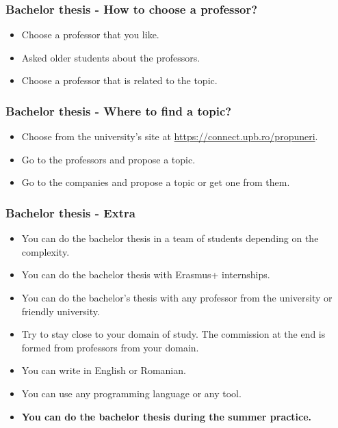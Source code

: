 \begin{frame}
\frametitle{Bachelor thesis - How to choose a professor?}
\begin{itemize}
    \item Choose a professor that you like.
    \item Asked older students about the professors.
    \item Choose a professor that is related to the topic.
\end{itemize}
\end{frame}

\begin{frame}
\frametitle{Bachelor thesis - Where to find a topic?}
\begin{itemize}
    \item Choose from the university's site at \url{https://connect.upb.ro/propuneri}.
    \item Go to the professors and propose a topic.
    \item Go to the companies and propose a topic or get one from them.
\end{itemize}
\end{frame}

\begin{frame}
\frametitle{Bachelor thesis - Extra}
\begin{itemize}
    \item You can do the bachelor thesis in a team of students depending on the complexity.
    \item You can do the bachelor thesis with Erasmus+ internships.
    \item You can do the bachelor's thesis with any professor from the university or friendly university.
    \item Try to stay close to your domain of study. The commission at the end is formed from professors from your domain.
    \item You can write in English or Romanian.
    \item You can use any programming language or any tool.
    \item \textbf{You can do the bachelor thesis during the summer practice.}
\end{itemize}
\end{frame}

